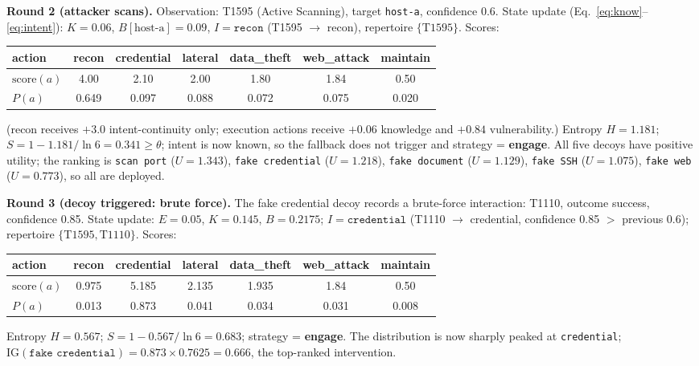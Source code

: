 \documentclass[preprints,article,accept,oneauthor]{Definitions/mdpi}
\newcommand{\act}[1]{\texttt{#1}}
\begin{document}
\textbf{Round 2 (attacker scans).} Observation: T1595 (Active Scanning),
target \act{host-a}, confidence 0.6. State update
(Eq.~\ref{eq:know}--\ref{eq:intent}): $K = 0.06$, $B[\text{host-a}] = 0.09$,
$I = \act{recon}$ (T1595 $\to$ recon), repertoire $\{\text{T1595}\}$.
Scores:
\begin{center}
\begin{adjustbox}{max width=\linewidth}\begin{tabular}{lcccccc}
\toprule
action & recon & credential & lateral & data\_theft & web\_attack & maintain \\
\midrule
$\mathrm{score}(a)$ & 4.00 & 2.10 & 2.00 & 1.80 & 1.84 & 0.50 \\
$P(a)$ & 0.649 & 0.097 & 0.088 & 0.072 & 0.075 & 0.020 \\
\bottomrule
\end{tabular}\end{adjustbox}
\end{center}
(recon receives $+3.0$ intent-continuity only; execution
actions receive $+0.06$ knowledge and $+0.84$ vulnerability.) Entropy
$H = 1.181$; $S = 1 - 1.181/\ln 6 = 0.341 \geq \theta$; intent is now
known, so the fallback does not trigger and strategy =
\textbf{engage}. All five decoys have positive utility; the ranking is
\act{scan port} ($U=1.343$), \act{fake credential} ($U=1.218$), \act{fake
document} ($U=1.129$), \act{fake SSH} ($U=1.075$), \act{fake web}
($U=0.773$), so all are deployed.

\textbf{Round 3 (decoy triggered: brute force).} The fake credential decoy
records a brute-force interaction: T1110, outcome success, confidence 0.85.
State update: $E = 0.05$, $K = 0.145$, $B = 0.2175$; $I = \act{credential}$
(T1110 $\to$ credential, confidence 0.85 $>$ previous 0.6); repertoire
$\{\text{T1595}, \text{T1110}\}$. Scores:
\begin{center}
\begin{adjustbox}{max width=\linewidth}\begin{tabular}{lcccccc}
\toprule
action & recon & credential & lateral & data\_theft & web\_attack & maintain \\
\midrule
$\mathrm{score}(a)$ & 0.975 & 5.185 & 2.135 & 1.935 & 1.84 & 0.50 \\
$P(a)$ & 0.013 & 0.873 & 0.041 & 0.034 & 0.031 & 0.008 \\
\bottomrule
\end{tabular}\end{adjustbox}
\end{center}
Entropy $H = 0.567$; $S = 1 - 0.567/\ln 6 = 0.683$; strategy =
\textbf{engage}. The distribution is now sharply peaked at
\act{credential}; $\mathrm{IG}(\act{fake credential}) = 0.873 \times
0.7625 = 0.666$, the top-ranked intervention.
\end{document}
